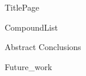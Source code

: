 \documentclass[10pt,a4paper]{article}
\begin{document}
{TitlePage}

{CompoundList}

\tableofcontents

{Abstract}
%
%
%
%
%
\newpage
{Conclusions}

\newpage
{Future_work}
%


\newpage
{}


\listoftodos
\end{document}
